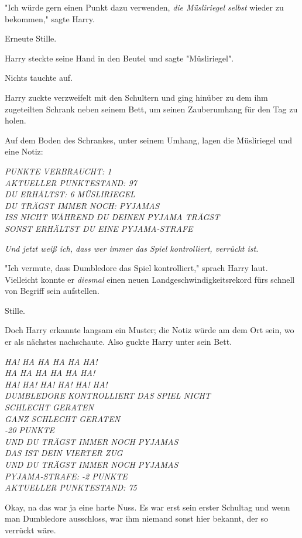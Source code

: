 {"Ich würde gern einen Punkt dazu verwenden, \emph{die Müsliriegel selbst} wieder zu bekommen," sagte Harry.

Erneute Stille.

Harry steckte seine Hand in den Beutel und sagte "Müsliriegel".

Nichts tauchte auf.

Harry zuckte verzweifelt mit den Schultern und ging hinüber zu dem ihm zugeteilten Schrank neben seinem Bett, um seinen Zauberumhang für den Tag zu holen.

Auf dem Boden des Schrankes, unter seinem Umhang, lagen die Müsliriegel und eine Notiz:

\emph{PUNKTE VERBRAUCHT: 1\\ AKTUELLER PUNKTESTAND: 97\\ DU ERHÄLTST: 6 MÜSLIRIEGEL\\ DU TRÄGST IMMER NOCH: PYJAMAS\\ ISS NICHT WÄHREND DU DEINEN} \emph{PYJAMA TRÄGST\\ SONST ERHÄLTST DU EINE PYJAMA-STRAFE}

\emph{Und jetzt weiß ich, dass wer immer das Spiel kontrolliert, verrückt ist.}

"Ich vermute, dass Dumbledore das Spiel kontrolliert," sprach Harry laut. Vielleicht konnte er \emph{diesmal} einen neuen Landgeschwindigkeitsrekord fürs schnell von Begriff sein aufstellen.

Stille.

Doch Harry erkannte langsam ein Muster; die Notiz würde am dem Ort sein, wo er als nächstes nachschaute. Also guckte Harry unter sein Bett.

\emph{HA! HA HA HA HA HA!\\ HA HA HA HA HA HA!\\ HA! HA! HA! HA! HA! HA!\\ DUMBLEDORE KONTROLLIERT DAS SPIEL NICHT\\ SCHLECHT GERATEN\\ GANZ SCHLECHT GERATEN\\ -20 PUNKTE\\ UND DU TRÄGST IMMER NOCH PYJAMAS\\ DAS IST DEIN VIERTER ZUG\\ UND DU TRÄGST IMMER NOCH PYJAMAS\\ PYJAMA-STRAFE: -2 PUNKTE\\ AKTUELLER PUNKTESTAND: 75}

Okay, na das war ja eine harte Nuss. Es war erst sein erster Schultag und wenn man Dumbledore ausschloss, war ihm niemand sonst hier bekannt, der so verrückt wäre.

}
